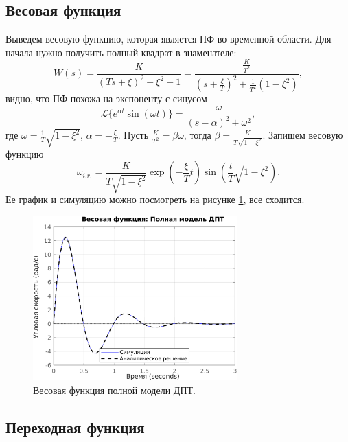 \subsection{Весовая функция}

Выведем весовую функцию, которая является ПФ во временной области. Для начала
нужно получить полный квадрат в знаменателе:
\begin{equation*}
    W(s)=\frac{K}{(Ts+\xi)^2-\xi^2+1}
    =\frac{\frac{K}{T^2}}{\left(s+\frac{\xi}{T}\right)^2+\frac{1}{T^2}(1-\xi^2)},
\end{equation*}
видно, что ПФ похожа на экспоненту с синусом
\begin{equation*}
    \mathcal L \{e^{\alpha t}\sin(\omega t)\}=\frac{\omega}{(s-\alpha)^2+\omega^2},
\end{equation*}
где $\omega=\frac{1}{T}\sqrt{1-\xi^2}$, $\alpha=-\frac{\xi}{T}$. Пусть $\frac{K}{T^2}=\beta\omega$,
тогда $\beta=\frac{K}{T\sqrt{1-\xi^2}}$. Запишем весовую функцию
\begin{equation*}
    \omega_{i.r.}=\frac{K}{T\sqrt{1-\xi^2}}\exp{\left(-\frac{\xi}{T}t\right)}\sin\left(\frac{t}{T}\sqrt{1-\xi^2}\right).
\end{equation*}
Ее график и симуляцию можно посмотреть на рисунке \ref{fig:task_2_impl}, все сходится.

\begin{figure}[htbp]
    \centering
    \includegraphics[width=0.7\textwidth]{figs/task_2_impl.png}
    \caption{Весовая функция полной модели ДПТ.}
    \label{fig:task_2_impl}
\end{figure}

\subsection{Переходная функция}

